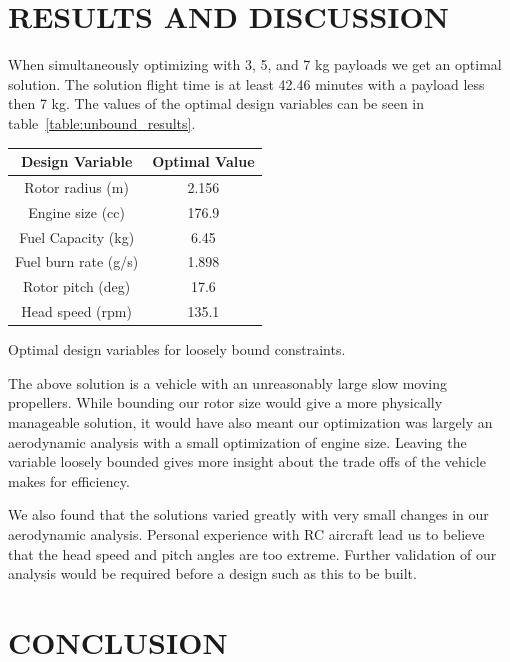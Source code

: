 \documentclass[letterpaper, 10 pt, conference]{ieeeconf}  %
\makeatletter
\newenvironment{tablehere}
  {\def\@captype{table}}
  {}
\makeatother
\begin{document}
\section{RESULTS AND DISCUSSION}

When simultaneously optimizing with 3, 5, and 7 kg payloads we get an optimal solution. The solution flight time is at least 42.46 minutes with a payload less then 7 kg. The values of the optimal design variables can be seen in table~\ref{table:unbound_results}. 

\begin{tablehere}
\centering
\vspace{5mm}
	\begin{tabulary}{0.5\textwidth}{|C|C|}
		\hline
		Design Variable & Optimal Value \\ \hline \hline
		Rotor radius (m) & 2.156 \\ \hline
		Engine size (cc) & 176.9 \\ \hline
		Fuel Capacity (kg) & 6.45 \\ \hline
		Fuel burn rate (g/s) & 1.898 \\ \hline
		Rotor pitch (deg) & 17.6 \\ \hline
		Head speed (rpm) & 135.1 \\ \hline
	\end{tabulary}
\caption{Optimal design variables for loosely bound constraints.}
\label{table:unbound_results}
\end{tablehere}

The above solution is a vehicle with an unreasonably large slow moving propellers. While bounding our rotor size would give a more physically manageable solution, it would have also meant our optimization was largely an aerodynamic analysis with a small optimization of engine size. Leaving the variable loosely bounded gives more insight about the trade offs of the vehicle makes for efficiency. 

We also found that the solutions varied greatly with very small changes in our aerodynamic analysis. Personal experience with RC aircraft lead us to believe that the head speed and pitch angles are too extreme. Further validation of our analysis would be required before a design such as this to be built. 



\section{CONCLUSION}
\end{document}
